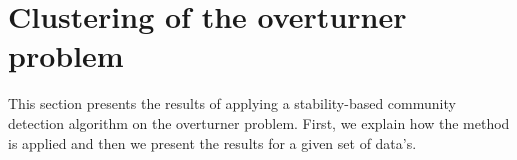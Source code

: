 \newpage
\section{Clustering of the overturner problem}

This section presents the results of applying a stability-based community detection algorithm on the overturner problem. First, we explain how the method is applied and then we present the results for a given set of data's.

% 	

